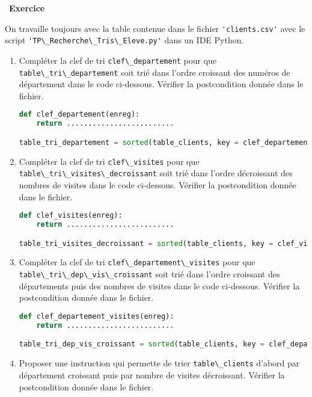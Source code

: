 \documentclass[
  11pt,
]{article}
\newcommand{\passthrough}[1]{#1}
\newcounter{exo}
\newenvironment{exercice}[1]
{\par \medskip   \addtocounter{exo}{1} \noindent  
\begin{bclogo}[arrondi =0.1,   noborder = true, logo=\bccrayon, marge=4]{~\textbf{Exercice} \textbf{\theexo} {\itshape #1} }  \par}
{
\end{bclogo}
 \par \bigskip }
\newcounter{def}
\begin{document}
\begin{exercice}{}

On travaille toujours avec la table contenue dans le fichier
\passthrough{\lstinline!'clients.csv'!} avec le script
\passthrough{\lstinline!'TP\_Recherche\_Tris\_Eleve.py'!} dans un IDE
Python.

\begin{enumerate}
\def\labelenumi{\arabic{enumi}.}
\item
  Compléter la clef de tri \passthrough{\lstinline!clef\_departement!}
  pour que \passthrough{\lstinline!table\_tri\_departement!} soit trié
  dans l'ordre croissant des numéros de département dans le code
  ci-dessous. Vérifier la postcondition donnée dans le fichier.

\begin{lstlisting}[language=Python]
def clef_departement(enreg):
    return .........................

table_tri_departement = sorted(table_clients, key = clef_departement)
\end{lstlisting}
\item
  Compléter la clef de tri \passthrough{\lstinline!clef\_visites!} pour
  que \passthrough{\lstinline!table\_tri\_visites\_decroissant!} soit
  trié dans l'ordre décroissant des nombres de visites dans le code
  ci-dessous. Vérifier la postcondition donnée dans le fichier.

\begin{lstlisting}[language=Python]
def clef_visites(enreg):
    return .........................

table_tri_visites_decroissant = sorted(table_clients, key = clef_visites, reverse = True)
\end{lstlisting}
\item
  Compléter la clef de tri
  \passthrough{\lstinline!clef\_departement\_visites!} pour que
  \passthrough{\lstinline!table\_tri\_dep\_vis\_croissant!} soit trié
  dans l'ordre croissant des départements puis des nombres de visites
  dans le code ci-dessous. Vérifier la postcondition donnée dans le
  fichier.

\begin{lstlisting}[language=Python]
def clef_departement_visites(enreg):
    return .........................

table_tri_dep_vis_croissant = sorted(table_clients, key = clef_departement_visites)
\end{lstlisting}
\item
  Proposer une instruction qui permette de trier
  \passthrough{\lstinline!table\_clients!} d'abord par département
  croissant puis par nombre de visites décroissant. Vérifier la
  postcondition donnée dans le fichier.


\end{enumerate}
\end{exercice}
\end{document}
